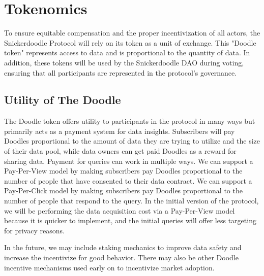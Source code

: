 \section{Tokenomics}
\label{section:tokenomics}


To ensure equitable compensation and the proper incentivization of all actors, the Snickerdoodle Protocol will rely on its token as a unit of exchange. This "Doodle token" represents access to data and is proportional to the quantity of data. In addition, these tokens will be used by the Snickerdoodle DAO during voting, ensuring that all participants are represented in the protocol's governance. 

\subsection{Utility of The Doodle}
The Doodle token offers utility to participants in the protocol in many ways but primarily acts as a payment system for data insights. Subscribers will pay Doodles proportional to the amount of data they are trying to utilize and the size of their data pool, while data owners can get paid Doodles as a reward for sharing data. Payment for queries can work in multiple ways. We can support a Pay-Per-View model by making subscribers pay Doodles proportional to the number of people that have consented to their data contract. We can support a Pay-Per-Click model by making subscribers pay Doodles proportional to the number of people that respond to the query. In the initial version of the protocol, we will be performing the data acquisition cost via a Pay-Per-View model because it is quicker to implement, and the initial queries will offer less targeting for privacy reasons. %

In the future, we may include staking mechanics to improve data safety and increase the incentivize for good behavior. There may also be other Doodle incentive mechanisms used early on to incentivize market adoption.

